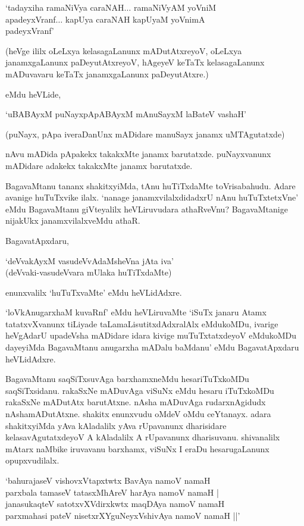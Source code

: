\begin{shloka}
`tadayxiha ramaNiVya caraNAH$\ldots$ ramaNiVyAM yoVniM\\
apadeyxVranf$\ldots$ kapUya caraNAH kapUyaM yoVnimA\\
padeyxVranf'
\end{shloka}

(heVge ililx oLeLxya kelasagaLanunx mADutAtxreyoV, oLeLxya janamxgaLanunx paDeyutAtxreyoV, hAgeyeV keTaTx kelasagaLanunx mADuvavaru keTaTx janamxgaLanunx paDeyutAtxre.)

eMdu heVLide,

\begin{shloka}
`uBABAyxM puNayxpApABAyxM mAnuSayxM laBateV vashaH'
\end{shloka}

(puNayx, pApa iveraDanUnx mADidare manuSayx janamx uMTAgutatxde)

nAvu mADida pApakekx takakxMte janamx barutatxde. puNayxvanunx mADidare adakekx takakxMte janamx barutatxde.

BagavaMtanu tananx shakitxyiMda, tAnu huTiTxdaMte toVrisabahudu. Adare avanige huTuTxvike ilalx. `nanage janamxvilalxdidadxrU nAnu huTuTxtetxVne' eMdu BagavaMtanu giVteyalilx heVLiruvudara athaRveVnu? BagavaMtanige nijakUkx janamxvilalxveMdu athaR.

BagavatApxdaru,

\begin{shloka}
`deVvakAyxM vasudeVvAdaMsheVna jAta iva'\\
(deVvaki-vasudeVvara mUlaka huTiTxdaMte)
\end{shloka}

enunxvalilx `huTuTxvaMte' eMdu heVLidAdxre.

`loVkAnugarxhaM kuvaRnf' eMdu heVLiruvaMte `iSuTx janaru Atamx tatatxvXvanunx tiLiyade taLamaLisutitxdAdxralAlx eMdukoMDu, ivarige heVgAdarU upadeVsha mADidare idara kivige muTuTxtatxdeyoV eMdukoMDu dayeyiMda BagavaMtanu anugarxha mADalu baMdanu' eMdu BagavatApxdaru heVLidAdxre.


BagavaMtanu saqSiTxsuvAga barxhamxneMdu hesariTuTxkoMDu saqSiTxsidanu. rakaSxNe mADuvAga viSuNx eMdu hesaru iTuTxkoMDu rakaSxNe mADutAtx barutAtxne. nAsha mADuvAga rudarxnAgidudx nAshamADutAtxne. shakitx enunxvudu oMdeV oMdu ceYtanayx. adara shakitxyiMda yAva kAladalilx yAva rUpavanunx dharisidare kelasavAgutatxdeyoV A kAladalilx A rUpavanunx dharisuvanu. shivanalilx mAtarx naMbike iruvavanu barxhamx, viSuNx I eraDu hesarugaLanunx opupxvudilalx.


\begin{shloka}
`bahurajaseV vishovxVtapxtwtx BavAya namoV namaH\\
parxbala tamaseV tatasxMhAreV harAya namoV namaH |\\
janasukaqteV satotxvXVdirxkwtx maqDAya namoV namaH\\
parxmahasi pateV nisetxrXYguNeyxVshivAya namoV namaH ||'
\end{shloka}

